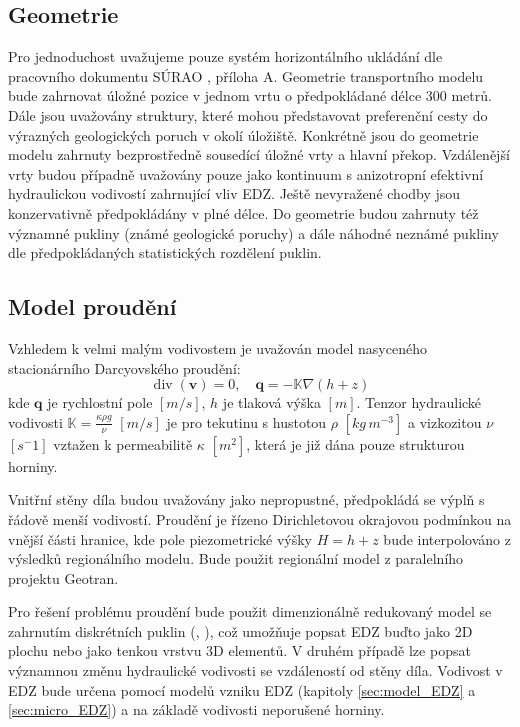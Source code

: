 \documentclass{article}
\def\grad{\nabla}
\def\div{\operatorname{div}}
\def\vc#1{\mathbf{\boldsymbol{#1}}}     %
\def\tn#1{{\mathbb{#1}}}    %
\begin{document}

\subsection{Geometrie}
\label{sec:transport_geometrie}
 Pro jednoduchost uvažujeme pouze systém horizontálního ukládání dle pracovního dokumentu SÚRAO , příloha A. 
 Geometrie transportního modelu bude zahrnovat úložné pozice v jednom vrtu o předpokládané délce 300 metrů. 
 Dále jsou uvažovány  struktury, které mohou představovat preferenční cesty do výrazných geologických poruch v okolí úložiště. 
 Konkrétně jsou do geometrie modelu zahrnuty bezprostředně sousedící úložné vrty a hlavní překop. Vzdálenější vrty budou případně 
 uvažovány pouze jako kontinuum s anizotropní efektivní hydraulickou vodivostí zahrnující vliv EDZ. 
Ještě nevyražené chodby jsou konzervativně předpokládány v plné délce. Do geometrie budou zahrnuty též významné pukliny 
(známé geologické poruchy) a dále náhodné neznámé pukliny dle předpokládaných statistických rozdělení puklin.


\subsection{Model proudění}
\label{sec:transport_flow}
Vzhledem k velmi malým vodivostem je uvažován model nasyceného stacionárního Darcyovského proudění:
\[
    \div(\vc v) = 0, \quad \vc q = -\tn K \grad (h + z)
\]
kde $\vc q$ je rychlostní pole $[m/s]$, $h$ je tlaková výška $[m]$. Tenzor hydraulické vodivosti $\tn K =\frac{\kappa \rho g}{\nu}$
 $[m/s]$ je pro tekutinu s hustotou $\rho$ $[kg\, m^{-3}]$ a vizkozitou $\nu$ $[s^-1]$ vztažen k permeabilitě $\kappa$ $[m^2]$, která je již dána pouze strukturou horniny.

Vnitřní stěny díla budou uvažovány jako nepropustné, předpokládá se výplň s řádově menší vodivostí. 
Proudění je řízeno Dirichletovou okrajovou podmínkou na vnější části hranice, kde pole piezometrické výšky $H = h + z$ 
bude interpolováno z výsledků regionálního modelu. Bude použit regionální model z paralelního projektu Geotran.

Pro řešení problému proudění bude použit dimenzionálně redukovaný model se zahrnutím diskrétních puklin (\cite{brezina_analysis_2015}, \cite{flow123d}),
což umožňuje popsat EDZ buďto jako 2D plochu nebo jako tenkou vrstvu 3D elementů.
V druhém případě lze popsat významnou změnu hydraulické vodivosti se vzdáleností od stěny díla.
Vodivost v EDZ bude určena pomocí modelů vzniku EDZ (kapitoly \ref{sec:model_EDZ} a \ref{sec:micro_EDZ}) 
a na základě vodivosti neporušené horniny.
\end{document}
